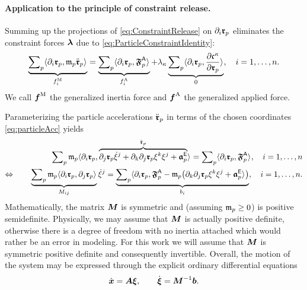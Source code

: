 \paragraph{Application to the principle of constraint release.}
Summing up the projections of \eqref{eq:ConstraintRelease} on $\dirDiff{\LidxI}\particlePos{\PidxI}$ eliminates the constraint forces $\LagrangeMult$ due to \eqref{eq:ParticleConstraintIdentity}:
\begin{align}\label{eq:ConstraintReleaseEliminated}
 \underbrace{\sumParticles \sProd{\dirDiff{\LidxI} \particlePos{\PidxI}}{\particleMass{\PidxI} \particlePosdd{\PidxI}}}_{\genForceInertiaCoeff{\LidxI}}
 = \underbrace{\sumParticles \sProd{\dirDiff{\LidxI} \particlePos{\PidxI}}{\particleForceImpressed{\PidxI}}}_{\genForceImpressedCoeff{\LidxI}}
 + \LagrangeMultCoeff{\CidxI} \underbrace{\sumParticles \sProd{\dirDiff{\LidxI} \particlePos{\PidxI}}{\pdiff[\particleGeoConstraintCoeff{\CidxI}]{\particlePos{\PidxI}}}}_{0},
 \quad \LidxI = 1,\ldots,\dimConfigSpace.
\end{align}
We call $\genForceInertia$ the generalized inertia force and $\genForceImpressed$ the generalized applied force.

Parameterizing the particle accelerations $\particlePosdd{\PidxI}$ in terms of the chosen coordinates \eqref{eq:particleAcc} yields 
\begin{align}
 \sumParticles \particleMass{\PidxI} \sProd{\dirDiff{\LidxI} \particlePos{\PidxI}}{\overbrace{\dirDiff{\LidxII} \particlePos{\PidxI} \sysVelCoeffd{\LidxII} + \dirDiff{\LidxIII} \dirDiff{\LidxII} \particlePos{\PidxI} \sysVelCoeff{\LidxIII} \sysVelCoeff{\LidxII} + \particleAccTime{\PidxI}}^{\particlePosdd{\PidxI}}}
 = \sumParticles \sProd{\dirDiff{\LidxI} \particlePos{\PidxI}}{\particleForceImpressed{\PidxI}},
 \quad \LidxI = 1,\ldots,\dimConfigSpace
\nonumber\\
\Leftrightarrow \qquad
 \underbrace{\sumParticles \particleMass{\PidxI} \sProd{\dirDiff{\LidxI} \particlePos{\PidxI}}{\dirDiff{\LidxII} \particlePos{\PidxI}}}_{\sysInertiaMatCoeff{\LidxI\LidxII}} \sysVelCoeffd{\LidxII}
 = \underbrace{\sumParticles \sProd{\dirDiff{\LidxI} \particlePos{\PidxI}}{\particleForceImpressed{\PidxI} - \particleMass{\PidxI} \big(\dirDiff{\LidxIII} \dirDiff{\LidxII} \particlePos{\PidxI} \sysVelCoeff{\LidxIII} \sysVelCoeff{\LidxII} + \particleAccTime{\PidxI}}\big)}_{\sysForceCoeff{\LidxI}},
 \quad \LidxI = 1,\ldots,\dimConfigSpace.
\end{align}
Mathematically, the matrix $\sysInertiaMat$ is symmetric and (assuming $\particleMass{\PidxI} \geq 0$) is positive semidefinite.
Physically, we may assume that $\sysInertiaMat$ is actually positive definite, otherwise there is a degree of freedom with no inertia attached which would rather be an error in modeling.
For this work we will assume that $\sysInertiaMat$ is symmetric positive definite and consequently invertible.
Overall, the motion of the system may be expressed through the explicit ordinary differential equations
\begin{align}
 \sysCoordd = \kinMat \sysVel,
\qquad 
 \sysVeld = \sysInertiaMat^{-1} \sysForce.
\end{align}

